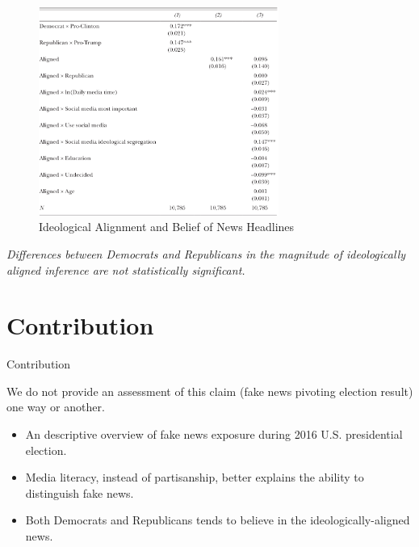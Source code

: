 \documentclass[
  10pt,
  ignorenonframetext,
  aspectratio=43,
]{beamer}
\providecommand{\tightlist}{%
  \setlength{\itemsep}{0pt}\setlength{\parskip}{0pt}}
\renewenvironment{quote}{\begin{customblockquote}\list{}{\rightmargin=0em\leftmargin=0em}%
\item\relax\color{blockquote-text}\ignorespaces}{\unskip\unskip\endlist\end{customblockquote}}
\begin{document}
\begin{frame}
\begin{figure}
\centering
\includegraphics[width=0.7\textwidth,height=\textheight]{20220315-allcott-gentzkow-2016-election-fake-news.assets/image-20220314182649354.png}
\caption{Ideological Alignment and Belief of News Headlines}
\end{figure}

\emph{Differences between Democrats and Republicans in the magnitude of
ideologically aligned inference are not statistically significant.}
\end{frame}

\hypertarget{contribution}{%
\section{Contribution}\label{contribution}}

\begin{frame}{Contribution}
\begin{quote}
We do not provide an assessment of this claim (fake news pivoting
election result) one way or another.
\end{quote}

\begin{itemize}
\tightlist
\item
  An descriptive overview of fake news exposure during 2016 U.S.
  presidential election.
\item
  Media literacy, instead of partisanship, better explains the ability
  to distinguish fake news.
\item
  Both Democrats and Republicans tends to believe in the
  ideologically-aligned news.
\end{itemize}
\end{frame}
\end{document}
